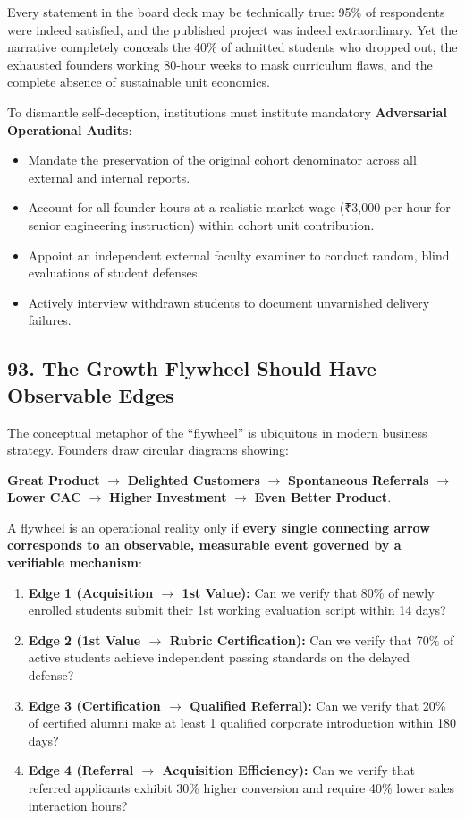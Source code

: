 Every statement in the board deck may be technically true: 95\% of respondents were indeed satisfied, and the published project was indeed extraordinary. Yet the narrative completely conceals the 40\% of admitted students who dropped out, the exhausted founders working 80-hour weeks to mask curriculum flaws, and the complete absence of sustainable unit economics.

To dismantle self-deception, institutions must institute mandatory \textbf{Adversarial Operational Audits}:
\begin{itemize}[leftmargin=*]
\item Mandate the preservation of the original cohort denominator across all external and internal reports.
\item Account for all founder hours at a realistic market wage (₹3,000 per hour for senior engineering instruction) within cohort unit contribution.
\item Appoint an independent external faculty examiner to conduct random, blind evaluations of student defenses.
\item Actively interview withdrawn students to document unvarnished delivery failures.
\end{itemize}

\subsection*{93. The Growth Flywheel Should Have Observable Edges}

The conceptual metaphor of the ``flywheel'' is ubiquitous in modern business strategy. Founders draw circular diagrams showing:
\begin{center}
\textbf{Great Product} $\longrightarrow$ \textbf{Delighted Customers} $\longrightarrow$ \textbf{Spontaneous Referrals} $\longrightarrow$ \textbf{Lower CAC} $\longrightarrow$ \textbf{Higher Investment} $\longrightarrow$ \textbf{Even Better Product}.
\end{center}

A flywheel is an operational reality only if \textbf{every single connecting arrow corresponds to an observable, measurable event governed by a verifiable mechanism}:
\begin{enumerate}[leftmargin=*]
\item \textbf{Edge 1 (Acquisition $\to$ 1st Value):} Can we verify that 80\% of newly enrolled students submit their 1st working evaluation script within 14 days?
\item \textbf{Edge 2 (1st Value $\to$ Rubric Certification):} Can we verify that 70\% of active students achieve independent passing standards on the delayed defense?
\item \textbf{Edge 3 (Certification $\to$ Qualified Referral):} Can we verify that 20\% of certified alumni make at least 1 qualified corporate introduction within 180 days?
\item \textbf{Edge 4 (Referral $\to$ Acquisition Efficiency):} Can we verify that referred applicants exhibit 30\% higher conversion and require 40\% lower sales interaction hours?
\end{enumerate}

